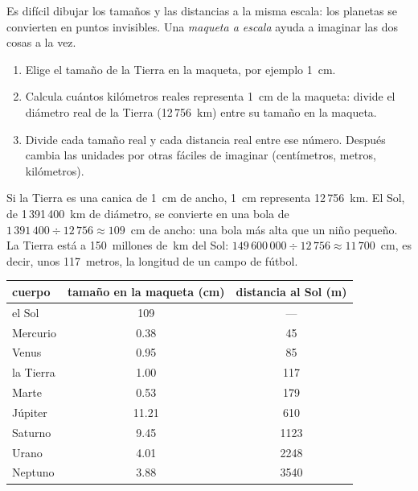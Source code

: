Es difícil dibujar los tamaños y las distancias a la misma escala: los
planetas se convierten en puntos invisibles. Una \emph{maqueta a escala}
ayuda a imaginar las dos cosas a la vez.

\begin{method}\label{met:g6:earth-a-planet:scale-model}
\begin{enumerate}
  \item Elige el tamaño de la Tierra en la maqueta, por ejemplo 1~cm.
  \item Calcula cuántos kilómetros reales representa 1~cm de la maqueta:
        divide el diámetro real de la Tierra (12\,756~km) entre su tamaño en
        la maqueta.
  \item Divide cada tamaño real y cada distancia real entre ese número.
        Después cambia las unidades por otras fáciles de imaginar
        (centímetros, metros, kilómetros).
\end{enumerate}
\end{method}

\begin{example}\label{ex:g6:earth-a-planet:marble}
Si la Tierra es una canica de 1~cm de ancho, 1~cm representa 12\,756~km.
El Sol, de 1\,391\,400~km de diámetro, se convierte en una bola de
$1\,391\,400 \div 12\,756 \approx
109$~cm de ancho: una bola más alta que un niño pequeño. La Tierra está a
150~millones de~km del Sol: $149\,600\,000 \div 12\,756 \approx 11\,700$~cm,
es decir, unos 117~metros, la longitud de un campo de fútbol.
\end{example}

\begin{center}\small
\begin{tabular}{|l|c|c|}
\hline
\textbf{cuerpo} & \textbf{tamaño en la maqueta (cm)} & \textbf{distancia al Sol (m)} \\
\hline
el Sol & 109 & --- \\
Mercurio & 0.38 & 45 \\
Venus & 0.95 & 85 \\
la Tierra & 1.00 & 117 \\
Marte & 0.53 & 179 \\
Júpiter & 11.21 & 610 \\
Saturno & 9.45 & 1123 \\
Urano & 4.01 & 2248 \\
Neptuno & 3.88 & 3540 \\
\hline
\end{tabular}
\end{center}

